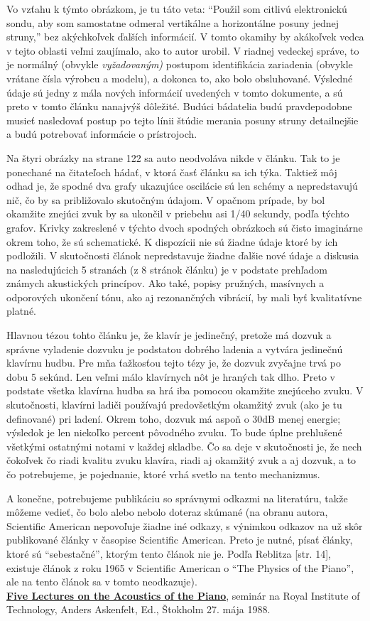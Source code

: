 \documentclass[11pt,a4paper]{book}
\begin{document}
Vo vzťahu k týmto obrázkom, je tu táto veta: “Použil som citlivú elektronickú sondu, aby som samostatne odmeral vertikálne a horizontálne posuny jednej struny,” bez akýchkoľvek ďalších informácií. V tomto okamihy by akákoľvek vedca v tejto oblasti veľmi zaujímalo, ako to autor urobil. V riadnej vedeckej správe, to je normálný (obvykle \textit{vyžadovaným)} postupom identifikácia zariadenia (obvykle vrátane čísla výrobcu a modelu), a dokonca to, ako bolo obsluhované. Výsledné údaje sú jedny z mála nových informácií uvedených v tomto dokumente, a sú preto v tomto článku nanajvýš dôležité. Budúci bádatelia budú pravdepodobne musieť nasledovať postup po tejto línii štúdie merania posuny struny detailnejšie a budú potrebovať informácie o prístrojoch. 

Na štyri obrázky na strane 122 sa auto neodvoláva nikde v článku. Tak to je ponechané na čitateľoch hádať, v ktorá časť článku sa ich týka. Taktiež môj odhad je, že spodné dva grafy ukazujúce oscilácie sú len schémy a nepredstavujú nič, čo by sa približovalo skutočným údajom. V opačnom prípade, by bol okamžite znejúci zvuk by sa ukončil v priebehu asi 1/40 sekundy, podľa týchto grafov. Krivky zakreslené v týchto dvoch spodných obrázkoch sú čisto imaginárne okrem toho, že sú schematické. K dispozícii nie sú žiadne údaje ktoré by ich podložili. V skutočnosti článok nepredstavuje žiadne ďalšie nové údaje a diskusia na nasledujúcich 5 stranách (z 8 stránok článku) je v podstate prehľadom známych akustických princípov. Ako také, popisy pružných, masívnych a odporových ukončení tónu, ako aj rezonančných vibrácií, by mali byť kvalitatívne platné. 

Hlavnou tézou tohto článku je, že klavír je jedinečný, pretože má dozvuk a správne vyladenie dozvuku je podstatou dobrého ladenia a vytvára jedinečnú klavírnu hudbu. Pre mňa ťažkosťou tejto tézy je, že dozvuk zvyčajne trvá po dobu 5 sekúnd. Len veľmi málo klavírnych nôt je hraných tak dlho. Preto v podstate všetka klavírna hudba sa hrá iba pomocou okamžite znejúceho zvuku. V skutočnosti, klavírni ladiči používajú predovšetkým okamžitý zvuk (ako je tu definované) pri ladení. Okrem toho, dozvuk má  aspoň o 30dB menej energie; výsledok je len niekoľko percent pôvodného zvuku. To bude úplne prehlušené  všetkými ostatnými notami v každej skladbe. Čo sa deje v skutočnosti je, že nech čokoľvek čo riadi kvalitu zvuku klavíra, riadi aj okamžitý zvuk a aj dozvuk, a to čo potrebujeme, je pojednanie, ktoré vrhá svetlo na tento mechanizmus. 

A konečne, potrebujeme publikáciu so správnymi odkazmi na literatúru, takže môžeme vedieť, čo bolo alebo nebolo doteraz skúmané (na obranu autora, Scientific American nepovoľuje žiadne iné odkazy, s výnimkou odkazov na už skôr publikované články v časopise Scientific American. Preto je nutné, písať články, ktoré sú “sebestačné”, ktorým tento článok nie je. Podľa Reblitza [str. 14], existuje článok z roku 1965 v Scientific American o “The Physics of the Piano”, ale na tento článok sa v tomto neodkazuje). 
\medskip\\
\textbf{\href{http://www.speech.kth.se/music/5_lectures/contents.html}{Five Lectures on the Acoustics of the Piano}}, seminár na Royal Institute of Technology, Anders Askenfelt, Ed., Štokholm 27. mája 1988. 
\end{document}

